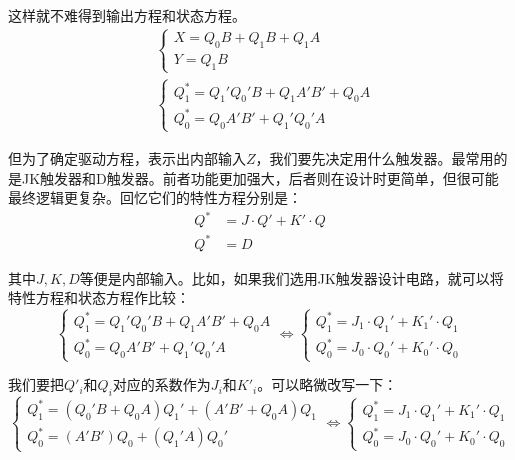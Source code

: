 \documentclass[UTF8]{ctexart}
\begin{document}
这样就不难得到输出方程和状态方程。
\begin{equation*}
\begin{aligned}
&\begin{cases}
X=Q_0B+Q_1B+Q_1A\\
Y=Q_1B
\end{cases}\\
&\begin{cases}
Q_1^*=Q_1'Q_0'B+Q_1A'B'+Q_0A\\
Q_0^*=Q_0A'B'+Q_1'Q_0'A
\end{cases}
\end{aligned}
\end{equation*}

但为了确定驱动方程，表示出内部输入$Z$，我们要先决定用什么触发器。最常用的是JK触发器和D触发器。前者功能更加强大，后者则在设计时更简单，但很可能最终逻辑更复杂。回忆它们的特性方程分别是：
\begin{equation*}
\begin{aligned}
Q^*&=J\cdot Q'+K'\cdot Q\\
Q^*&=D
\end{aligned}
\end{equation*}

其中$J,K,D$等便是内部输入。比如，如果我们选用JK触发器设计电路，就可以将特性方程和状态方程作比较：
\begin{equation*}
\begin{cases}
Q_1^*=Q_1'Q_0'B+Q_1A'B'+Q_0A\\
Q_0^*=Q_0A'B'+Q_1'Q_0'A
\end{cases}\Longleftrightarrow\begin{cases}
Q_1^*=J_1\cdot Q_1'+K_1'\cdot Q_1\\
Q_0^*=J_0\cdot Q_0'+K_0'\cdot Q_0
\end{cases}
\end{equation*}

我们要把$Q'_i$和$Q_i$对应的系数作为$J_i$和$K'_i$。可以略微改写一下：
\begin{equation*}
\begin{cases}
Q_1^*=(Q_0'B+Q_0A)Q_1'+(A'B'+Q_0A)Q_1\\
Q_0^*=(A'B')Q_0+(Q_1'A)Q_0'
\end{cases}\Longleftrightarrow\begin{cases}
Q_1^*=J_1\cdot Q_1'+K_1'\cdot Q_1\\
Q_0^*=J_0\cdot Q_0'+K_0'\cdot Q_0
\end{cases}
\end{equation*}
\end{document}
